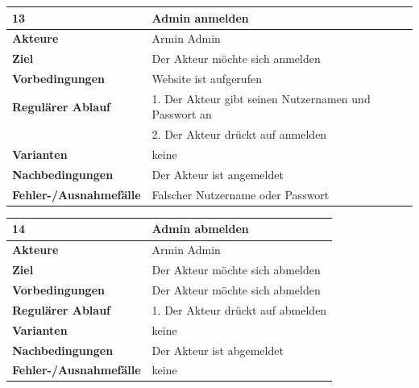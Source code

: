 \documentclass[fontsize=12pt,paper=a4,twoside]{scrartcl}
\begin{document}
\begin{table}
	[H] \label{13} 
	\begin{tabular}
		{|l|p{10cm}|} \hline \textbf{13} & \textbf{Admin anmelden} \\
		\hline \textbf{Akteure} & Armin Admin\\
		\hline \textbf{Ziel} & Der Akteur möchte sich anmelden\\
		\hline \textbf{Vorbedingungen} & Website ist aufgerufen\\
		\hline \textbf{Regulärer Ablauf} & 1. Der Akteur gibt seinen Nutzernamen und Passwort an\\
		&2. Der Akteur drückt auf anmelden\\
		\hline \textbf{Varianten} & keine \\
		\hline \textbf{Nachbedingungen} & Der Akteur ist angemeldet\\
		\hline \textbf{Fehler-/Ausnahmefälle} & Falscher Nutzername oder Passwort \\
		\hline 
	\end{tabular}
\end{table}

\begin{table}
	[H] \label{14} 
	\begin{tabular}
		{|l|p{10cm}|} \hline \textbf{14} & \textbf{Admin abmelden} \\
		\hline \textbf{Akteure} & Armin Admin\\
		\hline \textbf{Ziel} & Der Akteur möchte sich abmelden\\
		\hline \textbf{Vorbedingungen} & Der Akteur möchte sich abmelden\\
		\hline \textbf{Regulärer Ablauf} & 1. Der Akteur drückt auf abmelden\\
		\hline \textbf{Varianten} & keine \\
		\hline \textbf{Nachbedingungen} & Der Akteur ist abgemeldet\\
		\hline \textbf{Fehler-/Ausnahmefälle} & keine \\
		\hline 
	\end{tabular}
\end{table}
\end{document}
